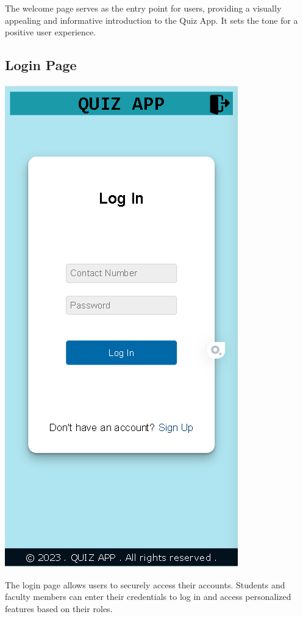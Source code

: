 The welcome page serves as the entry point for users, providing a visually appealing and informative introduction to the Quiz App. It sets the tone for a positive user experience.

\subsection{Login Page}
\begin{center}
    \includegraphics[scale=0.4]{project/images/LOGIN.png}
\end{center}

The login page allows users to securely access their accounts. Students and faculty members can enter their credentials to log in and access personalized features based on their roles.

